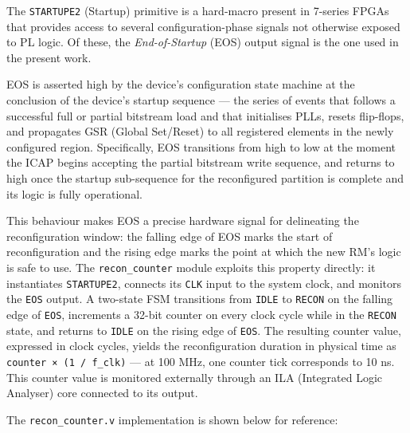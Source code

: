 The \texttt{STARTUPE2} (Startup) primitive is a hard-macro present in 7-series FPGAs that provides access to several configuration-phase signals not otherwise exposed to PL logic. Of these, the \textit{End-of-Startup} (EOS) output signal is the one used in the present work.

EOS is asserted high by the device's configuration state machine at the conclusion of the device's startup sequence — the series of events that follows a successful full or partial bitstream load and that initialises PLLs, resets flip-flops, and propagates GSR (Global Set/Reset) to all registered elements in the newly configured region. Specifically, EOS transitions from high to low at the moment the ICAP begins accepting the partial bitstream write sequence, and returns to high once the startup sub-sequence for the reconfigured partition is complete and its logic is fully operational.

This behaviour makes EOS a precise hardware signal for delineating the reconfiguration window: the falling edge of EOS marks the start of reconfiguration and the rising edge marks the point at which the new RM's logic is safe to use. The \texttt{recon\_counter} module exploits this property directly: it instantiates \texttt{STARTUPE2}, connects its \texttt{CLK} input to the system clock, and monitors the \texttt{EOS} output. A two-state FSM transitions from \texttt{IDLE} to \texttt{RECON} on the falling edge of \texttt{EOS}, increments a 32-bit counter on every clock cycle while in the \texttt{RECON} state, and returns to \texttt{IDLE} on the rising edge of \texttt{EOS}. The resulting counter value, expressed in clock cycles, yields the reconfiguration duration in physical time as \texttt{counter × (1 / f\_clk)} — at 100 MHz, one counter tick corresponds to 10 ns. This counter value is monitored externally through an ILA (Integrated Logic Analyser) core connected to its output.

The \texttt{recon\_counter.v} implementation is shown below for reference:

